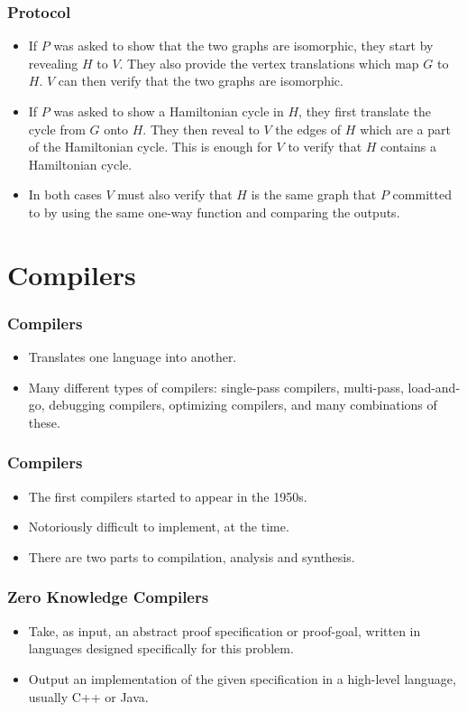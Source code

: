 \documentclass{beamer}
\begin{document}
\begin{frame}
	\frametitle{Protocol}
	\begin{itemize}
		\item If $P$ was asked to show that the two graphs are isomorphic, they
		start by revealing $H$ to $V$. They also provide the vertex translations
		which map $G$ to $H$. $V$ can then verify that the two graphs are isomorphic.
		
		\item If $P$ was asked to show a Hamiltonian cycle in $H$, they first 
		translate the cycle from $G$ onto $H$. They then reveal to $V$ the 
		edges of $H$ which are a part of the Hamiltonian cycle. This is
		enough for $V$ to verify that $H$ contains a Hamiltonian cycle.
		
		\item In both cases $V$ must also verify that $H$ is the same graph 
		that $P$ committed to by using the same one-way function and comparing 
		the outputs.
		
	\end{itemize}
\end{frame}

\section{Compilers}

\begin{frame}
	\frametitle{Compilers}
	\begin{itemize}
		\item Translates one language into another. 
		\item Many different types of
	compilers: single-pass compilers, multi-pass, load-and-go, debugging compilers,
	optimizing compilers, and many combinations of these.
	\end{itemize}
\end{frame}

\begin{frame}
	\frametitle{Compilers}
	\begin{itemize}
		\item The first compilers started to appear in the 1950s.
		\item Notoriously difficult to implement, at the time.
		\item There are two parts to compilation, analysis and synthesis.
	\end{itemize}
\end{frame}

\begin{frame}
	\frametitle{Zero Knowledge Compilers}
	\begin{itemize}
		\item Take, as input, an abstract proof specification or proof-goal, 
		written in languages designed specifically for this problem.
		\item Output an implementation of the given specification in
    a high-level language, usually C++ or Java.
	\end{itemize}
\end{frame}
\end{document}
